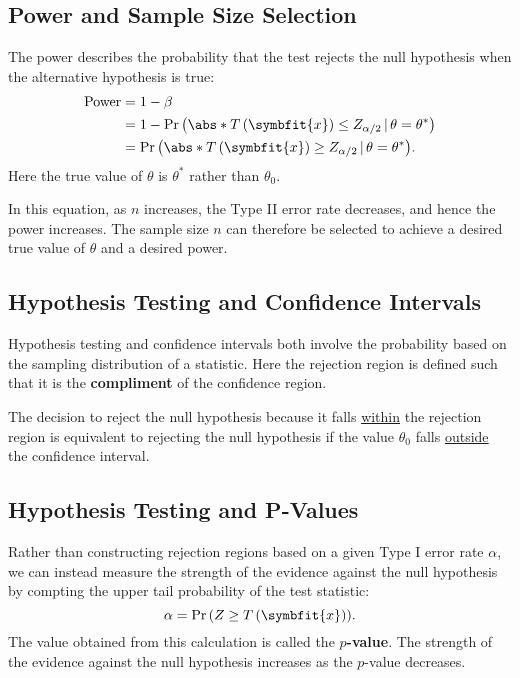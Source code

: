 \documentclass{article}
\begin{document}
\begin{multicols}{3}
\subsection{Power and Sample Size Selection}
The power describes the probability that the test rejects the null hypothesis when the alternative hypothesis is true:
\begin{align*}
    \operatorname{Power} & = 1 - \beta                                                                                                   \\
                         & = 1 - \Pr{\left( \abs*{T\left( \symbfit{x} \right)} \leq Z_{\alpha/2} \,\vert\, \theta = \theta^\ast \right)} \\
                         & = \Pr{\left( \abs*{T\left( \symbfit{x} \right)} \geq Z_{\alpha/2} \,\vert\, \theta = \theta^\ast \right)}.
\end{align*}
Here the true value of \(\theta\) is \(\theta^\ast\) rather than \(\theta_0\).

In this equation, as \(n\) increases, the Type II error rate decreases, and hence the power increases.
The sample size \(n\) can therefore be selected to achieve a desired true value of \(\theta\) and a desired power.
\subsection{Hypothesis Testing and Confidence Intervals}
Hypothesis testing and confidence intervals both involve the probability based on the sampling distribution of a statistic.
Here the rejection region is defined such that it is the \textbf{compliment} of the confidence region.

The decision to reject the null hypothesis because it falls \underline{within} the rejection region is equivalent to
rejecting the null hypothesis if the value \(\theta_0\) falls \underline{outside} the confidence interval.
\subsection{Hypothesis Testing and P-Values}
Rather than constructing rejection regions based on a given Type I error rate \(\alpha\), we
can instead measure the strength of the evidence against the null hypothesis by compting the
upper tail probability of the test statistic:
\begin{equation*}
    \alpha = \Pr{\left( Z \geq T\left( \symbfit{x} \right) \right)}.
\end{equation*}
The value obtained from this calculation is called the \textbf{\(p\)-value}.
The strength of the evidence against the null hypothesis increases as the \(p\)-value decreases.

\end{multicols}
\end{document}
